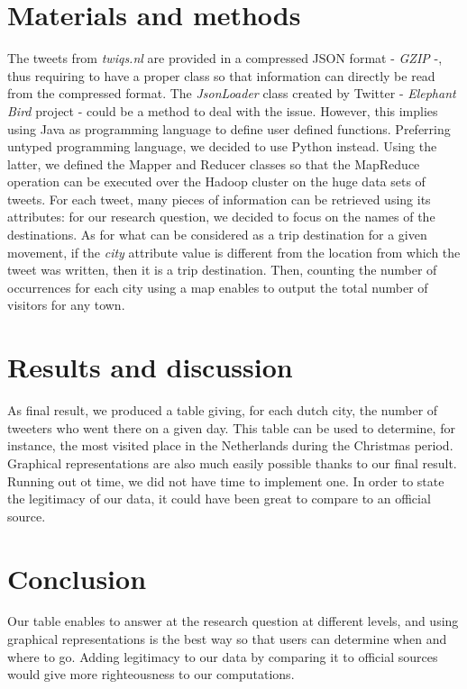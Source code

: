 \documentclass[conference]{doc}
\begin{document}
	\section{Materials and methods}
		The tweets from \emph{twiqs.nl} are provided in a compressed JSON format -
		\emph{GZIP} -, thus requiring to have a proper class so that information can
		directly be read from the compressed format. The \emph{JsonLoader}
		class created by Twitter - \emph{Elephant Bird} project - could be a method to deal with the
		issue. However, this implies using Java as programming language to define user
		defined functions. Preferring untyped programming language, we decided to use
		Python instead. Using the latter, we defined the Mapper and Reducer classes so
		that the MapReduce operation can be executed over the Hadoop cluster on the
		huge data sets of tweets. For each tweet, many pieces of information can be
		retrieved using its attributes: for our research question, we decided to focus
		on the names of the destinations. As for what can be considered as a
		trip destination for a given movement, if the \emph{city} attribute value is
		different from the location from which the tweet was written, then it is a
		trip destination. Then, counting the number of occurrences for each city using
		a map enables to output the total number of visitors for any town.
		
	\section{Results and discussion}
		As final result, we produced a table giving, for each dutch city, the number
		of tweeters who went there on a given day. This table can be used to
		determine, for instance, the most visited place in the Netherlands during the
		Christmas period. Graphical representations are also much easily possible
		thanks to our final result. Running out ot time, we did not have time to
		implement one. In order to state the legitimacy of our data, it could have
		been great to compare to an official source.


	\section{Conclusion}
		Our table enables to answer at the research question at different levels, and
		using graphical representations is the best way so that users can determine
		when and where to go. Adding legitimacy to our data by comparing it to
		official sources would give more righteousness to our computations.
\end{document}
